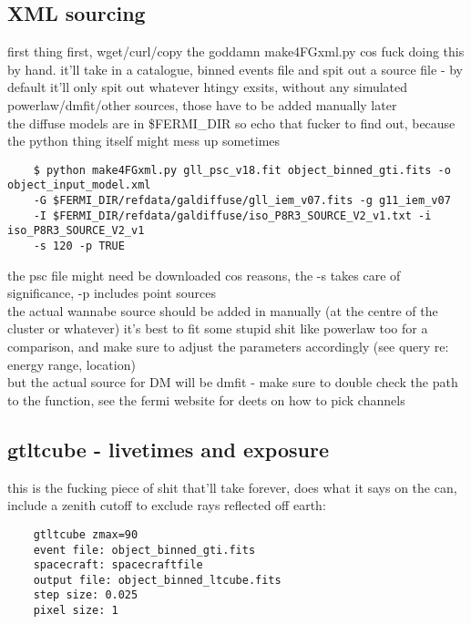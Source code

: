 \documentclass{article}
\begin{document}
\subsection{XML sourcing}%
first thing first, wget/curl/copy the goddamn make4FGxml.py cos fuck doing this by hand. it'll take in a catalogue, binned events file and spit out a source file - by default it'll only spit out whatever htingy exsits, without any simulated powerlaw/dmfit/other sources, those have to be added manually later\\
the diffuse models are in \$FERMI\_DIR so echo that fucker to find out, because the python thing itself might mess up sometimes
\begin{verbatim}
    $ python make4FGxml.py gll_psc_v18.fit object_binned_gti.fits -o object_input_model.xml 
    -G $FERMI_DIR/refdata/galdiffuse/gll_iem_v07.fits -g g11_iem_v07 
    -I $FERMI_DIR/refdata/galdiffuse/iso_P8R3_SOURCE_V2_v1.txt -i iso_P8R3_SOURCE_V2_v1 
    -s 120 -p TRUE
\end{verbatim}
the psc file might need be downloaded cos reasons, the -s takes care of significance, -p includes point sources \\
the actual wannabe source should be added in manually (at the centre of the cluster or whatever)
it's best to fit some stupid shit like powerlaw too for a comparison, and make sure to adjust the parameters accordingly (see query re: energy range, location)\\
but the actual source for DM will be dmfit - make sure to double check the path to the function, see the fermi website for deets on how to pick channels
\subsection{gtltcube - livetimes and exposure}%
this is the fucking piece of shit that'll take forever, does what it says on the can, include a zenith cutoff to exclude rays reflected off earth:
\begin{verbatim}
    gtltcube zmax=90
    event file: object_binned_gti.fits
    spacecraft: spacecraftfile
    output file: object_binned_ltcube.fits
    step size: 0.025
    pixel size: 1
\end{verbatim}
\end{document}
